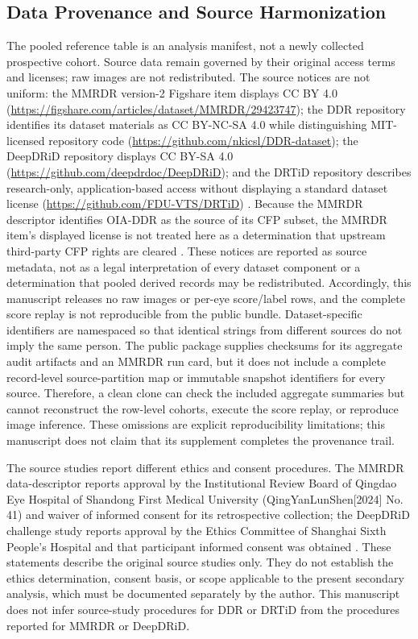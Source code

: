 \documentclass{ieeeaccess}
\begin{document}
\subsection{Data Provenance and Source Harmonization}
The pooled reference table is an analysis manifest, not a newly collected prospective cohort. Source data remain governed by their original access terms and licenses; raw images are not redistributed. The source notices are not uniform: the MMRDR version-2 Figshare item displays CC BY 4.0 (\url{https://figshare.com/articles/dataset/MMRDR/29423747}); the DDR repository identifies its dataset materials as CC BY-NC-SA 4.0 while distinguishing MIT-licensed repository code (\url{https://github.com/nkicsl/DDR-dataset}); the DeepDRiD repository displays CC BY-SA 4.0 (\url{https://github.com/deepdrdoc/DeepDRiD}); and the DRTiD repository describes research-only, application-based access without displaying a standard dataset license (\url{https://github.com/FDU-VTS/DRTiD}) \cite{mmrdrdata,ddr,deepdrid,drtidpaper}. Because the MMRDR descriptor identifies OIA-DDR as the source of its CFP subset, the MMRDR item's displayed license is not treated here as a determination that upstream third-party CFP rights are cleared \cite{mmrdr,ddr}. These notices are reported as source metadata, not as a legal interpretation of every dataset component or a determination that pooled derived records may be redistributed. Accordingly, this manuscript releases no raw images or per-eye score/label rows, and the complete score replay is not reproducible from the public bundle. Dataset-specific identifiers are namespaced so that identical strings from different sources do not imply the same person. The public package supplies checksums for its aggregate audit artifacts and an MMRDR run card, but it does not include a complete record-level source-partition map or immutable snapshot identifiers for every source. Therefore, a clean clone can check the included aggregate summaries but cannot reconstruct the row-level cohorts, execute the score replay, or reproduce image inference. These omissions are explicit reproducibility limitations; this manuscript does not claim that its supplement completes the provenance trail.

The source studies report different ethics and consent procedures. The MMRDR data-descriptor reports approval by the Institutional Review Board of Qingdao Eye Hospital of Shandong First Medical University (QingYanLunShen[2024] No. 41) and waiver of informed consent for its retrospective collection; the DeepDRiD challenge study reports approval by the Ethics Committee of Shanghai Sixth People's Hospital and that participant informed consent was obtained \cite{mmrdrdata,deepdrid}. These statements describe the original source studies only. They do not establish the ethics determination, consent basis, or scope applicable to the present secondary analysis, which must be documented separately by the author. This manuscript does not infer source-study procedures for DDR or DRTiD from the procedures reported for MMRDR or DeepDRiD.
\end{document}
